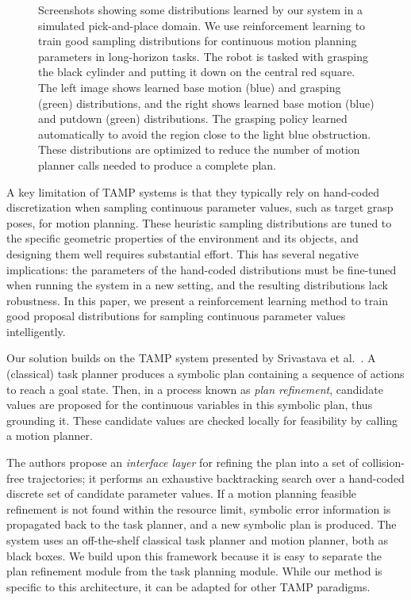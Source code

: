 \begin{figure}[h]
  \caption{Screenshots showing some distributions learned by our system in a simulated pick-and-place
    domain. We use reinforcement learning to train good sampling distributions for continuous motion
    planning parameters in long-horizon tasks. The robot is tasked with grasping the black cylinder and putting it down on the
    central red square. The left image shows learned base motion (blue) and grasping (green) distributions,
    and the right shows learned base motion (blue) and putdown (green) distributions. The grasping policy
    learned automatically to avoid the region close to the light blue obstruction. These distributions are
    optimized to reduce the number of motion planner calls needed to produce a complete plan.}
  \label{fig:cover}
\end{figure}

A key limitation of TAMP systems is that they typically rely on hand-coded discretization when
sampling continuous parameter values, such as target grasp poses, for motion planning.
These heuristic sampling distributions are tuned to the specific
geometric properties of the environment and its objects, and designing them well
requires substantial effort. This has several negative implications: the parameters of the
hand-coded distributions must be fine-tuned when running the system in a new setting, and the
resulting distributions lack robustness. In this paper, we present a reinforcement
learning method to train good proposal distributions for sampling continuous parameter
values intelligently.

Our solution builds on the TAMP system
presented by Srivastava et al.~\cite{srivastava2014combined}.
A (classical) task planner produces a symbolic plan containing
a sequence of actions to reach a goal state. Then, in a process known as \emph{plan refinement},
candidate values are proposed for the continuous variables in this symbolic plan, thus grounding it.
These candidate values are checked locally for feasibility by calling a motion planner.

The authors propose an \emph{interface layer} for refining the plan into a set
of collision-free trajectories; it performs an exhaustive
backtracking search over a hand-coded discrete set of candidate parameter values. If a motion
planning feasible refinement is not found within the resource limit,
symbolic error information is propagated back to the task planner, and a new symbolic plan is produced.
The system uses an off-the-shelf classical task planner and motion planner, both as black boxes.
We build upon this framework because it is easy to separate the plan refinement module from the task planning module.
While our method is specific to this architecture, it can be adapted for other TAMP paradigms.

